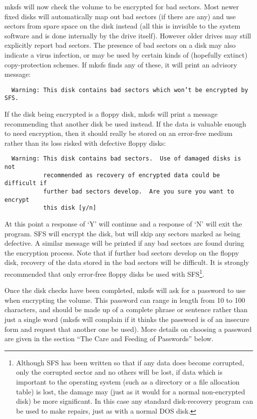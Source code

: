 mksfs will now check the volume to be encrypted for bad sectors.  Most newer
fixed disks will automatically map out bad sectors (if there are any) and use
sectors from spare space on the disk instead (all this is invisible to the
system software and is done internally by the drive itself).  However older
drives may still explicitly report bad sectors.  The presence of bad sectors on
a disk may also indicate a virus infection, or may be used by certain kinds of
(hopefully extinct) copy-protection schemes.  If mksfs finds any of these, it
will print an advisory message:

{\small \tt \verb|  |Warning: This disk contains bad sectors which won't be encrypted by SFS.}

If the disk being encrypted is a floppy disk, mksfs will print a message
recommending that another disk be used instead.  If the data is valuable enough
to need encryption, then it should really be stored on an error-free medium
rather than its loss risked with defective floppy disks:
{\small

\begin{verbatim}
  Warning: This disk contains bad sectors.  Use of damaged disks is not
           recommended as recovery of encrypted data could be difficult if
           further bad sectors develop.  Are you sure you want to encrypt
           this disk [y/n]
\end{verbatim}

}
At this point a response of `Y' will continue and a response of `N' will exit
the program.  SFS will encrypt the disk, but will skip any sectors marked as
being defective.  A similar message will be printed if any bad sectors are
found during the encryption process.  Note that if further bad sectors develop
on the floppy disk, recovery of the data stored in the bad sectors will be
difficult.  It is strongly recommended that only error-free floppy disks be
used with SFS\footnote{
              Although SFS has been written so that if any data does become
              corrupted, only the corrupted sector and no others will be lost,
              if data which is important to the operating system (such as a
              directory or a file allocation table) is lost, the damage may
              (just as it would for a normal non-encrypted disk) be more
              significant.  In this case any standard disk-recovery program can
              be used to make repairs, just as with a normal DOS disk.
}.

Once the disk checks have been completed, mksfs will ask for a password to use
when encrypting the volume.  This password can range in length from 10 to 100
characters, and should be made up of a complete phrase or sentence rather than
just a single word (mksfs will complain if it thinks the password is of an
insecure form and request that another one be used).  More details on choosing
a password are given in the section ``The Care and Feeding of Passwords'' below.

